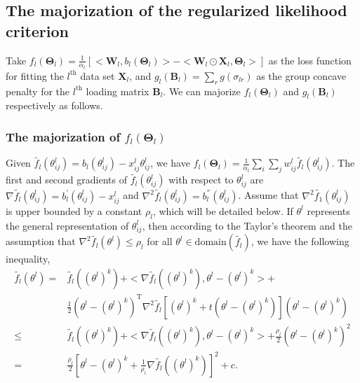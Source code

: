 \subsection{The majorization of the regularized likelihood criterion}
Take $f_l(\mathbf{\Theta}_l) = \frac{1}{\alpha_l} \left[<\mathbf{W}_l, b_l(\mathbf{\Theta}_l)> - <\mathbf{W}_l \odot \mathbf{X}_l, \mathbf{\Theta}_l>\right]$ as the loss function for fitting the $l^{\text{th}}$ data set $\mathbf{X}_l$, and $g_l(\mathbf{B}_l) = \sum_{r} g(\sigma_{lr})$ as the group concave penalty for the $l^{\text{th}}$ loading matrix $\mathbf{B}_l$. We can majorize $f_l(\mathbf{\Theta}_l)$ and $g_l(\mathbf{B}_l)$ respectively as follows.

\subsubsection*{The majorization of $f_l(\mathbf{\Theta}_l)$}
Given $\tilde{f_l}(\theta_{ij}^{l}) = b_l(\theta_{ij}^{l}) - x_{ij}^{l}\theta_{ij}^{l}$, we have $f_l(\mathbf{\Theta}_l) = \frac{1}{\alpha_l} \sum_{i}\sum_{j} w_{ij}^{l} \tilde{f_l}(\theta_{ij}^{l})$. The first and second gradients of $\tilde{f_l}(\theta_{ij}^{l})$ with respect to $\theta_{ij}^{l}$ are $\nabla \tilde{f_l}(\theta_{ij}^{l}) = b_l^{'}(\theta_{ij}^{l}) - x_{ij}^{l}$ and $\nabla^2 \tilde{f_l}(\theta_{ij}^{l}) = b_l^{''}(\theta_{ij}^{l})$. Assume that $\nabla^2 \tilde{f_{1}}(\theta_{ij}^{l})$ is upper bounded by a constant $\rho_{l}$, which will be detailed below. If $\theta^{l}$ represents the general representation of $\theta_{ij}^{l}$, then according to the Taylor's theorem and the assumption that $\nabla^2 \tilde{f_{l}}(\theta^{l}) \leq \rho_{l}$ for all $\theta^{l} \in \text{domain}(\tilde{f_l})$, we have the following inequality,
\begin{equation}\label{chapter5_eq:3}
\begin{split}
\tilde{f_l}(\theta^{l}) = &\tilde{f_l}((\theta^{l})^k) + <\nabla \tilde{f_l}((\theta^{l})^k), \theta^{l}-(\theta^{l})^k> + \\ &\frac{1}{2}(\theta^{l}-(\theta^{l})^k)^{\text{T}} \nabla^{2} \tilde{f_l}\left[(\theta^{l})^k + t(\theta^{l}-(\theta^{l})^k)\right](\theta^{l}-(\theta^{l})^k)\\
\leq& \tilde{f_l}((\theta^{l})^k) + <\nabla \tilde{f_l}((\theta^{l})^k), \theta^{l}-(\theta^{l})^k> + \frac{\rho_{l}}{2}(\theta^{l}-(\theta^{l})^k)^2 \\
=& \frac{\rho_{l}}{2}\left[\theta^{l}-(\theta^{l})^k + \frac{1}{\rho_l}\nabla \tilde{f_l}((\theta^{l})^k)\right]^2 + c.
\end{split}
\end{equation}
